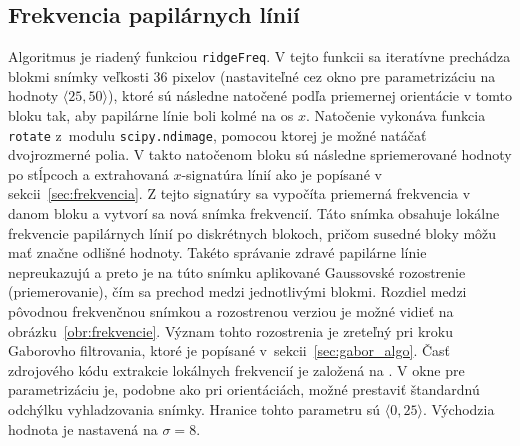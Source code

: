   \subsection{Frekvencia papilárnych línií}
  Algoritmus je riadený funkciou \texttt{ridgeFreq}. V tejto funkcii sa iteratívne prechádza blokmi snímky veľkosti 36 pixelov (nastaviteľné cez okno pre
  parametrizáciu na hodnoty $\langle{}25,50\rangle{}$), ktoré sú následne natočené
  podľa priemernej orientácie v tomto bloku tak, aby papilárne línie boli kolmé na os $x$. Natočenie vykonáva funkcia \texttt{rotate} z~modulu
  \texttt{scipy.ndimage}, pomocou ktorej je možné natáčať dvojrozmerné polia. V takto natočenom bloku sú následne spriemerované hodnoty po stĺpcoch
  a extrahovaná $x$-signatúra línií ako je popísané v sekcii~{\ref{sec:frekvencia}}. Z tejto signatúry sa vypočíta priemerná frekvencia v danom bloku a vytvorí
  sa nová snímka frekvencií. Táto snímka
  obsahuje lokálne frekvencie papilárnych línií po diskrétnych blokoch, pričom susedné bloky môžu mať značne odlišné hodnoty. Takéto správanie zdravé papilárne
  línie nepreukazujú a preto je na túto snímku aplikované Gaussovské rozostrenie (priemerovanie), čím sa  prechod medzi jednotlivými blokmi.
  Rozdiel medzi pôvodnou frekvenčnou snímkou a rozostrenou verziou je možné vidieť na obrázku~{\ref{obr:frekvencie}}. Význam tohto rozostrenia je zreteľný pri
  kroku Gaborovho filtrovania, ktoré je popísané v~sekcii~{\ref{sec:gabor_algo}}.
  Časť zdrojového kódu extrakcie lokálnych frekvencií je založená na \cite{KovesiMATLABCode}.
  V okne pre parametrizáciu je, podobne ako pri orientáciách, možné prestaviť štandardnú odchýlku vyhladzovania snímky. Hranice tohto parametru sú
  $\langle{}0,25\rangle{}$.
  Východzia hodnota je nastavená na $\sigma = 8$.

